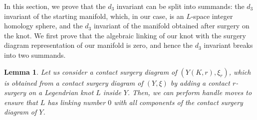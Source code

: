 \documentclass[12pt]{amsart}
\newtheorem{lemma}[theorem]{Lemma}
\theoremstyle{definition}
\theoremstyle{definition}
\begin{document}
In this section, we prove that the $d_3$ invariant can be split into summands: the $d_3$ invariant of the starting manifold, which, in our case, is an $L$-space integer homology sphere, and the $d_3$ invariant of the manifold obtained after surgery on the knot. We first prove that the algebraic linking of our knot with the surgery diagram representation of our manifold is zero, and hence the $d_3$ invariant breaks into two summands.
\begin{lemma}
    Let us consider a contact surgery diagram of $(Y(K,r),\xi_r)$, which is obtained from a contact surgery diagram of $(Y,\xi)$ by adding a contact $r$-surgery on a Legendrian knot $L$ inside $Y$. Then, we can perform handle moves to ensure that $L$ has linking number $0$ with all components of the contact surgery diagram of $Y$.
\end{lemma}
\end{document}
